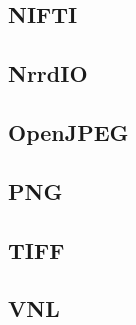 \subsection{NIFTI}


\subsection{NrrdIO}


\subsection{OpenJPEG}


\subsection{PNG}


\subsection{TIFF}


\subsection{VNL}


